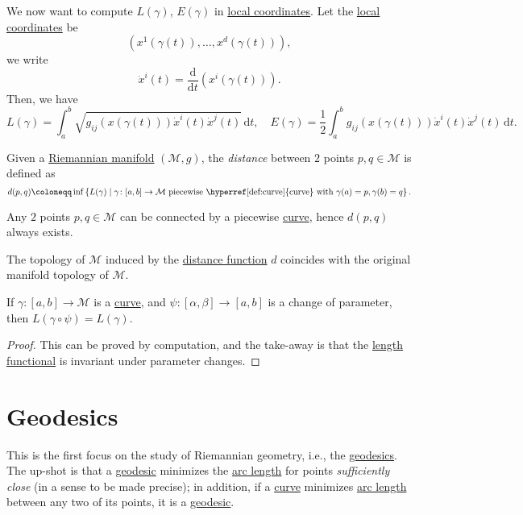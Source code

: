 We now want to compute \(L(\gamma )\), \(E(\gamma )\) in \hyperref[def:coordinate-chart]{local coordinates}. Let the \hyperref[def:coordinate-chart]{local coordinates} be
\[
	(x^1(\gamma (t)), \ldots , x^d(\gamma (t))),
\]
we write
\[
	\dot{x}^i (t) = \frac{\mathrm{d}}{\mathrm{d}t} (x^i (\gamma (t))).
\]
Then, we have
\[
	L(\gamma ) = \int_{a}^{b} \sqrt{g_{ij} (x(\gamma (t))) \dot{x}^i(t)\dot{x}^j(t)}  \,\mathrm{d}t, \quad
	E(\gamma ) = \frac{1}{2} \int_{a}^{b} g_{ij} (x(\gamma (t))) \dot{x}^i(t)\dot{x}^j(t) \,\mathrm{d}t.
\]

\begin{definition}[Distance]\label{def:distance}
	Given a \hyperref[def:Riemannian-manifold]{Riemannian manifold} \((\mathcal{M} , g)\), the \emph{distance} between \(2\) points \(p, q\in \mathcal{M} \) is defined as
	\[
		d(p, q)\coloneqq \inf \left\{ L(\gamma ) \mid \gamma \colon [a, b]\to  \mathcal{M} \text{ piecewise \hyperref[def:curve]{curve} with }\gamma (a)=p, \gamma (b)=q \right\} .
	\]
\end{definition}

\begin{note}
	Any \(2\) points \(p, q\in \mathcal{M} \) can be connected by a piecewise \hyperref[def:curve]{curve}, hence \(d(p, q)\) always exists.
\end{note}

\begin{corollary}
	The topology of \(\mathcal{M} \) induced by the \hyperref[def:distance]{distance function} \(d\) coincides with the original manifold topology of \(\mathcal{M} \).
\end{corollary}

\begin{lemma}
	If \(\gamma\colon [a, b] \to  \mathcal{M} \) is a \hyperref[def:curve]{curve}, and \(\psi \colon [\alpha , \beta ] \to  [a, b]\) is a change of parameter, then \(L(\gamma \circ \psi ) = L(\gamma )\).
\end{lemma}
\begin{proof}
	This can be proved by computation, and the take-away is that the \hyperref[def:length]{length functional} is invariant under parameter changes.
\end{proof}

\chapter{Geodesics}
This is the first focus on the study of Riemannian geometry, i.e., the \hyperref[def:geodesic]{geodesics}. The up-shot is that a \hyperref[def:geodesic]{geodesic} minimizes the \hyperref[def:length]{arc length} for points \emph{sufficiently close} (in a sense to be made precise); in addition, if a \hyperref[def:curve]{curve} minimizes \hyperref[def:length]{arc length} between any two of its points, it is a \hyperref[def:geodesic]{geodesic}.

